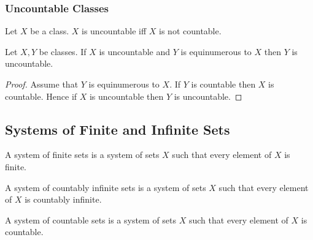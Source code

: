 \documentclass[10pt]{article}
\begin{document}
  \subsubsection*{Uncountable Classes}

  \begin{forthel}
    \begin{definition}
      Let $X$ be a class.
      $X$ is uncountable iff $X$ is not countable.
    \end{definition}
  \end{forthel}

  \begin{forthel}
    \begin{proposition}
      Let $X, Y$ be classes.
      If $X$ is uncountable and $Y$ is equinumerous to $X$ then $Y$ is uncountable.
    \end{proposition}
    \begin{proof}
      Assume that $Y$ is equinumerous to $X$.
      If $Y$ is countable then $X$ is countable.
      Hence if $X$ is uncountable then $Y$ is uncountable.
    \end{proof}
  \end{forthel}


  \subsection*{Systems of Finite and Infinite Sets}

  \begin{forthel}
    \begin{definition}
      A system of finite sets is a system of sets $X$ such that every element of $X$ is finite.
    \end{definition}
  \end{forthel}

  \begin{forthel}
    \begin{definition}
      A system of countably infinite sets is a system of sets $X$ such that every element of $X$ is countably infinite.
    \end{definition}
  \end{forthel}

  \begin{forthel}
    \begin{definition}
      A system of countable sets is a system of sets $X$ such that every element of $X$ is countable.
    \end{definition}
  \end{forthel}
\end{document}
